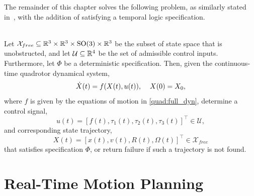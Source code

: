 The remainder of this chapter solves the following problem, as similarly stated in~\cite{Allen2016}, with the addition of satisfying a temporal logic specification.
\begin{problem}
    \  \\
    Let $\mathcal{X}_{free} \subseteq \mathbb{R}^3 \times \mathbb{R}^3 \times \text{SO}(3) \times \mathbb{R}^3$ be the subset of state space that is unobstructed, and let $\mathcal{U} \subseteq \mathbb{R}^4$ be the set of admissible control inputs. Furthermore, let $\Phi$ be a deterministic \mucalc{} specification. Then, given the continuous-time quadrotor dynamical system,
    \begin{equation}
        \dot X(t) = f(X(t), u(t)),\hspace{4mm} X(0) = X_0,\label{quad:generic_sys}
    \end{equation}
    where $f$ is given by the equations of motion in \autoref{quad:full_dyn},
    determine a control signal,
    \begin{equation}
        u(t) = {[f(t), \tau_1(t), \tau_2(t), \tau_3(t)]}^\top \in \mathcal{U},
    \end{equation}
    and corresponding state trajectory, 
    \begin{equation}
        X(t) = {[x(t), v(t), R(t), \Omega(t)]}^\top \in \mathcal{X}_{free}
    \end{equation}
    that satisfies specification $\Phi$, or return failure if such a trajectory is not found.
\label{quad:problem}
\end{problem}




\section{Real-Time Motion Planning}\label{chap:quad:rtmp}

